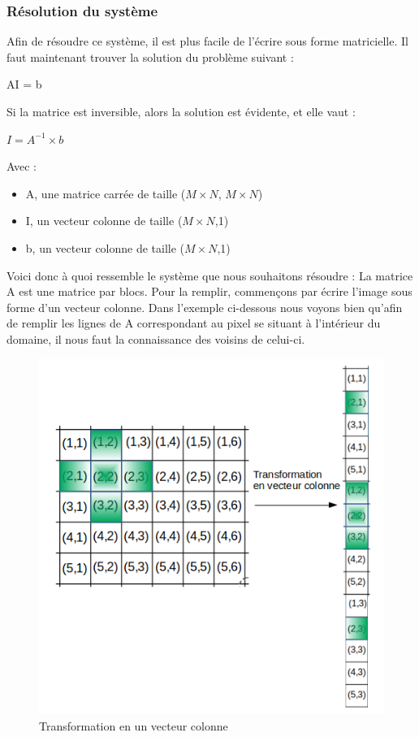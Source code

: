 \subsubsection{Résolution du système}
Afin de résoudre ce système, il est plus facile de l'écrire sous forme matricielle. Il faut maintenant trouver la solution du problème suivant : 
\begin{center}
 AI = b 
\end{center}
Si la matrice est inversible, alors la solution est évidente, et elle vaut : 
\begin{center}
$I = A^{-1}\times b$
\end{center} 
Avec : 
\begin{itemize}
\item A, une matrice carrée de taille ($M\times N$, $M\times N$)
\item I, un vecteur colonne de taille ($M\times N$,1)
\item b, un vecteur colonne de taille ($M\times N$,1)
\end{itemize}
Voici donc à quoi ressemble le système que nous souhaitons résoudre :\newline
La matrice A est une matrice par blocs. Pour la remplir, commençons par écrire l'image sous forme d'un vecteur colonne. Dans l'exemple ci-dessous nous voyons bien qu'afin de remplir les lignes de A correspondant au pixel se situant à l'intérieur du domaine, il nous faut la connaissance des voisins de celui-ci.
\begin{figure}[!h]
\centering
\includegraphics[scale=0.5]{Images/laplacienIJ.png}
\caption{Transformation en un vecteur colonne}
\end{figure}

